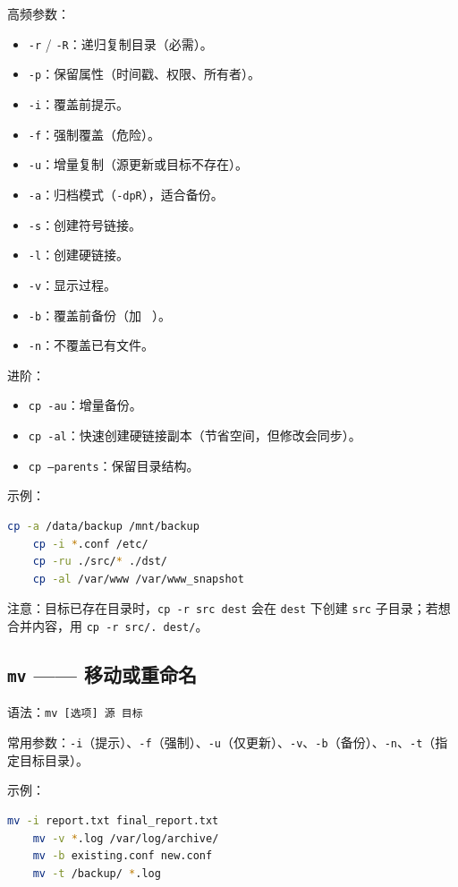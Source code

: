 高频参数：
\begin{itemize}
\item \texttt{-r} / \texttt{-R}：递归复制目录（必需）。
\item \texttt{-p}：保留属性（时间戳、权限、所有者）。
\item \texttt{-i}：覆盖前提示。
\item \texttt{-f}：强制覆盖（危险）。
\item \texttt{-u}：增量复制（源更新或目标不存在）。
\item \texttt{-a}：归档模式（\texttt{-dpR}），适合备份。
\item \texttt{-s}：创建符号链接。
\item \texttt{-l}：创建硬链接。
\item \texttt{-v}：显示过程。
\item \texttt{-b}：覆盖前备份（加 \texttt{\string~}）。
\item \texttt{-n}：不覆盖已有文件。
\end{itemize}

进阶：
\begin{itemize}
\item \texttt{cp -au}：增量备份。
\item \texttt{cp -al}：快速创建硬链接副本（节省空间，但修改会同步）。
\item \texttt{cp --parents}：保留目录结构。
\end{itemize}

示例：
\begin{lstlisting}[language=bash]
	cp -a /data/backup /mnt/backup
	cp -i *.conf /etc/
	cp -ru ./src/* ./dst/
	cp -al /var/www /var/www_snapshot
\end{lstlisting}

注意：目标已存在目录时，\texttt{cp -r src dest} 会在 \texttt{dest} 下创建 \texttt{src} 子目录；若想合并内容，用 \texttt{cp -r src/. dest/}。

\subsection*{\texttt{mv} —— 移动或重命名} 语法：\texttt{mv [选项] 源 目标}

常用参数：\texttt{-i}（提示）、\texttt{-f}（强制）、\texttt{-u}（仅更新）、\texttt{-v}、\texttt{-b}（备份）、\texttt{-n}、\texttt{-t}（指定目标目录）。

示例：
\begin{lstlisting}[language=bash]
	mv -i report.txt final_report.txt
	mv -v *.log /var/log/archive/
	mv -b existing.conf new.conf
	mv -t /backup/ *.log
\end{lstlisting}

